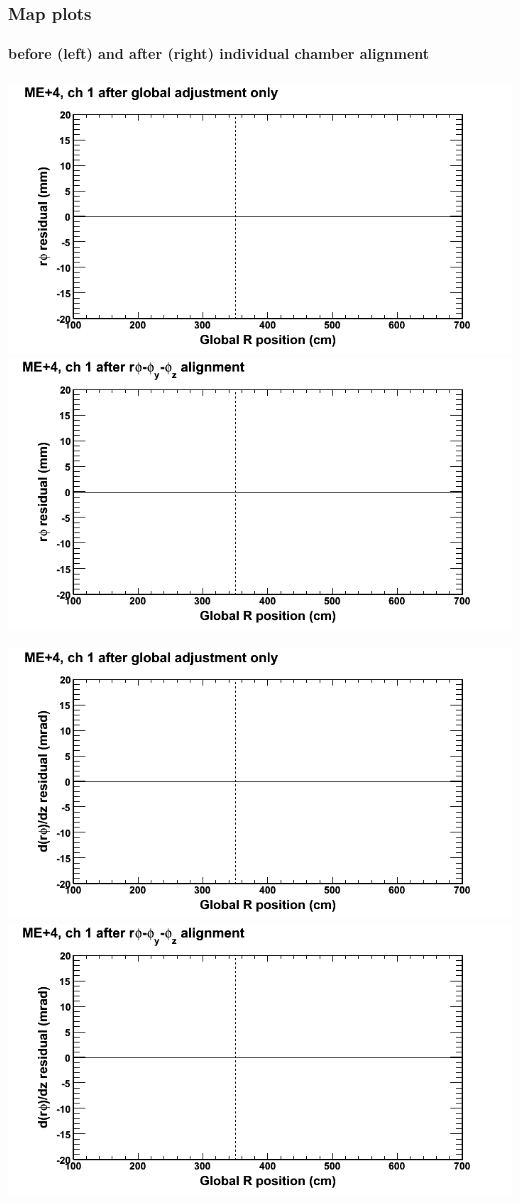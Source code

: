 \documentclass[compress]{beamer}
\begin{document}
\begin{frame}
\frametitle{Map plots}
\framesubtitle{before (left) and after (right) individual chamber alignment}
\includegraphics[width=0.5\linewidth]{ringmapplots_3dof/before_CSCvsr_mep4ch01_x.png} \includegraphics[width=0.5\linewidth]{ringmapplots_3dof/after_CSCvsr_mep4ch01_x.png}

\includegraphics[width=0.5\linewidth]{ringmapplots_3dof/before_CSCvsr_mep4ch01_dxdz.png} \includegraphics[width=0.5\linewidth]{ringmapplots_3dof/after_CSCvsr_mep4ch01_dxdz.png}
\end{frame}
\end{document}
